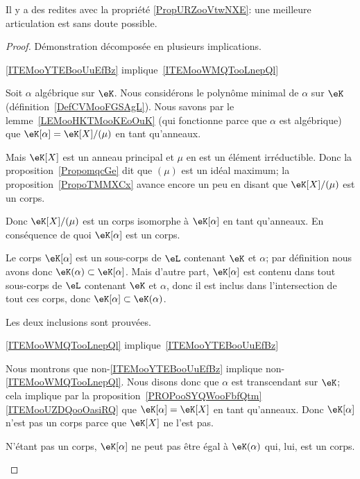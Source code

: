 \begin{probleme}
Il y a des redites avec la propriété \ref{PropURZooVtwNXE}: une meilleure articulation est sans doute possible.
\end{probleme}

\begin{proof}
    Démonstration décomposée en plusieurs implications.
    \begin{subproof}
        \item[\ref{ITEMooYTEBooUuEfBz} implique~\ref{ITEMooWMQTooLnepQl}]

            Soit \( \alpha\) algébrique sur \( \eK\). Nous considérons le polynôme minimal de \( \alpha\) sur \( \eK\) (définition~\ref{DefCVMooFGSAgL}). Nous savons par le lemme~\ref{LEMooHKTMooKEoOuK} (qui fonctionne parce que \( \alpha\) est algébrique) que \( \eK[\alpha]=\eK[X]/(\mu)\) en tant qu'anneaux.

            Mais \( \eK[X]\) est un anneau principal et \( \mu\) en est un élément irréductible. Donc la proposition~\ref{PropomqcGe} dit que \( (\mu)\) est un idéal maximum; la proposition~\ref{PropoTMMXCx} avance encore un peu en disant que \( \eK[X]/(\mu)\) est un corps.

            Donc \( \eK[X]/(\mu)\) est un corps isomorphe à \( \eK[\alpha]\) en tant qu'anneaux. En conséquence de quoi \( \eK[\alpha]\) est un corps.

            Le corps \( \eK[\alpha]\) est un sous-corps de \( \eL\) contenant \( \eK\) et \( \alpha\); par définition nous avons donc \( \eK(\alpha)\subset \eK[\alpha]\). Mais d'autre part, \( \eK[\alpha]\) est contenu dans tout sous-corps de \( \eL\) contenant \( \eK\) et \( \alpha\), donc il est inclus dans l'intersection de tout ces corps, donc \( \eK[\alpha]\subset \eK(\alpha)\).

            Les deux inclusions sont prouvées.

        \item[\ref{ITEMooWMQTooLnepQl} implique~\ref{ITEMooYTEBooUuEfBz}]

            Nous montrons que non-\ref{ITEMooYTEBooUuEfBz} implique non-\ref{ITEMooWMQTooLnepQl}. Nous disons donc que \( \alpha\) est transcendant sur \( \eK\); cela implique par la proposition~\ref{PROPooSYQWooFbfQtm}\ref{ITEMooUZDQooOasiRQ} que \( \eK[\alpha]=\eK[X]\) en tant qu'anneaux. Donc \( \eK[\alpha]\) n'est pas un corps parce que \( \eK[X]\) ne l'est pas.

            N'étant pas un corps, \( \eK[\alpha]\) ne peut pas être égal à \( \eK(\alpha)\) qui, lui, est un corps.


\end{subproof}
\end{proof}
